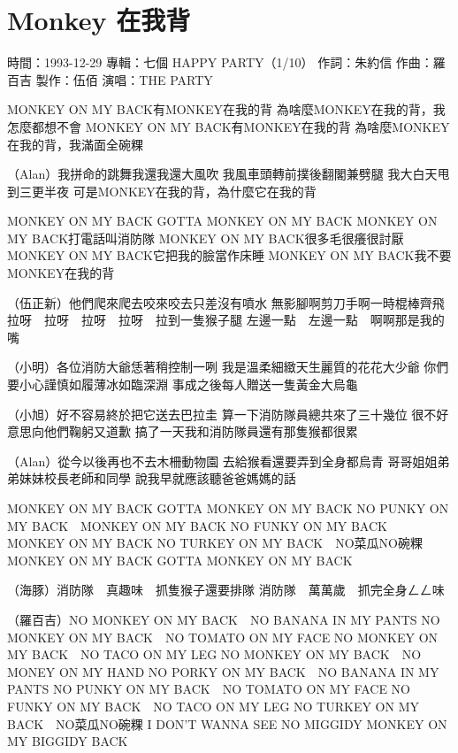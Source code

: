 \documentclass[UTF8,a4paper,oneside,twocolumn,12pt]{ctexbook}
\newcommand{\infopair}[2]{\textbullet #1：#2}
\newcommand{\zc}[1][伍佰]{\infopair{作詞}{#1}}
\newcommand{\zq}[1][伍佰]{\infopair{作曲}{#1}}
\newcommand{\zj}[1]{\infopair{專輯}{#1}}
\newcommand{\zz}[1]{\infopair{製作}{#1}}
\newcommand{\sj}[1]{\infopair{時間}{#1}}
\newenvironment{info}{\begin{flushleft}\kaishu
	}
	{\end{flushleft}\normalsize\yahei\par}
\newenvironment{lyric}{
	}
{}
\begin{document}
\section{Monkey 在我背}
\begin{info}
	\sj{1993-12-29}
	\zj{七個 HAPPY PARTY（1/10）}
	\zc[朱約信]
	\zq[羅百吉]
	\zz{伍佰}
	\infopair{演唱}{THE PARTY}
\end{info}
\begin{lyric}
	MONKEY ON MY BACK有MONKEY在我的背
	為啥麼MONKEY在我的背，我怎麼都想不會
	MONKEY ON MY BACK有MONKEY在我的背
	為啥麼MONKEY在我的背，我滿面全碗粿

	（Alan）我拼命的跳舞我還我還大風吹
	我風車頭轉前撲後翻閣兼劈腿
	我大白天甩到三更半夜
	可是MONKEY在我的背，為什麼它在我的背

	MONKEY ON MY BACK GOTTA MONKEY ON MY BACK
	MONKEY ON MY BACK打電話叫消防隊
	MONKEY ON MY BACK很多毛很癢很討厭
	MONKEY ON MY BACK它把我的臉當作床睡
	MONKEY ON MY BACK我不要MONKEY在我的背

	（伍正新）他們爬來爬去咬來咬去只差沒有噴水
	無影腳啊剪刀手啊一時棍棒齊飛
	拉呀　拉呀　拉呀　拉呀　拉到一隻猴子腿
	左邊一點　左邊一點　啊啊那是我的嘴

	（小明）各位消防大爺恁著稍控制一咧
	我是溫柔細緻天生麗質的花花大少爺
	你們要小心謹慎如履薄冰如臨深淵
	事成之後每人贈送一隻黃金大烏龜

	（小旭）好不容易終於把它送去巴拉圭
	算一下消防隊員總共來了三十幾位
	很不好意思向他們鞠躬又道歉
	搞了一天我和消防隊員還有那隻猴都很累

	（Alan）從今以後再也不去木柵動物園
	去給猴看還要弄到全身都烏青
	哥哥姐姐弟弟妹妹校長老師和同學
	說我早就應該聽爸爸媽媽的話

	MONKEY ON MY BACK GOTTA MONKEY ON MY BACK
	NO PUNKY ON MY BACK　MONKEY ON MY BACK
	NO FUNKY ON MY BACK　MONKEY ON MY BACK
	NO TURKEY ON MY BACK　NO菜瓜NO碗粿
	MONKEY ON MY BACK GOTTA MONKEY ON MY BACK

	（海豚）消防隊　真趣味　抓隻猴子還要排隊
	消防隊　萬萬歲　抓完全身ㄥㄥ味

	（羅百吉）NO MONKEY ON MY BACK　NO BANANA IN MY PANTS
	NO MONKEY ON MY BACK　NO TOMATO ON MY FACE
	NO MONKEY ON MY BACK　NO TACO ON MY LEG
	NO MONKEY ON MY BACK　NO MONEY ON MY HAND
	NO PORKY ON MY BACK　NO BANANA IN MY PANTS
	NO PUNKY ON MY BACK　NO TOMATO ON MY FACE
	NO FUNKY ON MY BACK　NO TACO ON MY LEG
	NO TURKEY ON MY BACK　NO菜瓜NO碗粿
	I DON'T WANNA SEE NO MIGGIDY MONKEY ON MY BIGGIDY BACK
\end{lyric}
\end{document}
